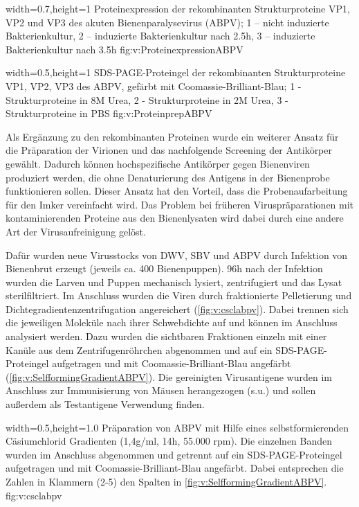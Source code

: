 {width=0.7\textwidth,height=1\textheight}
{Proteinexpression der rekombinanten Strukturproteine VP1, VP2 und VP3 des akuten Bienenparalysevirus (ABPV); 1 – nicht induzierte Bakterienkultur, 2 – induzierte Bakterienkultur nach 2.5h, 3 – induzierte Bakterienkultur nach 3.5h
}%
{}%
{fig:v:ProteinexpressionABPV}%

{width=0.5\textwidth,height=1\textheight}
{SDS-PAGE-Proteingel der rekombinanten Strukturproteine VP1, VP2, VP3 des ABPV, gefärbt mit Coomassie-Brilliant-Blau; 1 - Strukturproteine in 8M Urea, 2 - Strukturproteine in 2M Urea, 3 - Strukturproteine in PBS
}%
{}%
{fig:v:ProteinprepABPV}%


Als Ergänzung zu den rekombinanten Proteinen wurde ein weiterer Ansatz für die Präparation der Virionen und das nachfolgende Screening der Antikörper gewählt. Dadurch können hochspezifische Antikörper gegen Bienenviren produziert werden, die ohne Denaturierung des Antigens in der Bienenprobe funktionieren sollen. Dieser Ansatz hat den Vorteil, dass die Probenaufarbeitung für den Imker vereinfacht wird. Das Problem bei früheren Viruspräparationen mit kontaminierenden Proteine aus den Bienenlysaten wird dabei durch eine andere Art der Virusaufreinigung gelöst.

Dafür wurden neue Virusstocks von DWV, SBV und ABPV durch Infektion von Bienenbrut erzeugt (jeweils ca. 400 Bienenpuppen). 96h nach der Infektion wurden die Larven und Puppen mechanisch lysiert, zentrifugiert und das Lysat sterilfiltriert. Im Anschluss wurden die Viren durch fraktionierte Pelletierung und Dichtegradientenzentrifugation angereichert (\cref{fig:v:csclabpv}). Dabei trennen sich die jeweiligen Moleküle nach ihrer Schwebdichte auf und können im Anschluss analysiert werden. Dazu wurden die sichtbaren Fraktionen einzeln mit einer Kanüle aus dem Zentrifugenröhrchen abgenommen und auf ein SDS-PAGE-Proteingel aufgetragen und mit Coomassie-Brilliant-Blau angefärbt (\cref{fig:v:SelfformingGradientABPV}).
Die gereinigten Virusantigene wurden im Anschluss zur Immunisierung von Mäusen herangezogen (s.u.) und sollen außerdem als Testantigene Verwendung finden. 

{width=0.5\textwidth,height=1.0\textheight}
{Präparation von ABPV mit Hilfe eines selbstformierenden Cäsiumchlorid Gradienten (1,4g/ml, 14h, 55.000 rpm). Die einzelnen Banden wurden im Anschluss abgenommen und getrennt auf ein SDS-PAGE-Proteingel aufgetragen und mit Coomassie-Brilliant-Blau angefärbt. Dabei entsprechen die Zahlen in Klammern (2-5) den Spalten in \cref{fig:v:SelfformingGradientABPV}.}%
{}%
{fig:v:csclabpv}%


